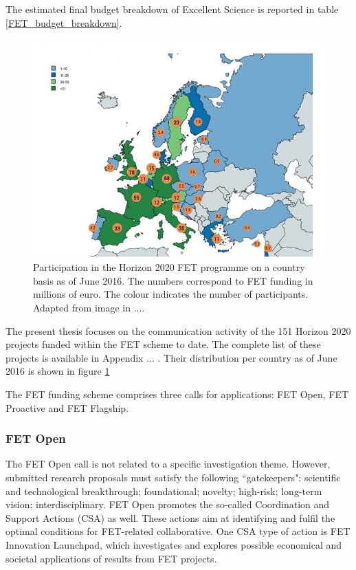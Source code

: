 The estimated final budget breakdown of Excellent Science is reported in table \ref{FET_budget_breakdown}.

\begin{figure}[!t] 
 \begin{center}
 \includegraphics[scale=0.3]{Images/Country_participation_in_H2020_FET_projects.jpg}
 \caption{Participation in the Horizon 2020 FET programme on a country basis as of June 2016. The numbers correspond to FET funding in millions of euro. The colour indicates the number of participants. Adapted from image in ....}
 \label{Country_participation_in_H2020_FET_projects}
 \end{center}
\end{figure}


The present thesis focuses on the communication activity of the 151 Horizon 2020 projects funded within the FET scheme to date. The complete list of these projects is available in Appendix ... . Their distribution per country as of June 2016 is shown in figure \ref{Country_participation_in_H2020_FET_projects}

The FET funding scheme comprises three calls for applications: FET Open, FET Proactive and FET Flagship.

\subsubsection{FET Open}
The FET Open call is not related to a specific investigation theme. However, submitted research proposals must satisfy the following ``gatekeepers": scientific and technological breakthrough; foundational; novelty; high-risk; long-term vision; interdisciplinary. FET Open promotes the so-called Coordination and Support Actions (CSA) as well. These actions aim at identifying and fulfil the optimal conditions for FET-related collaborative. One CSA type of action is FET Innovation Launchpad, which investigates and explores possible economical and societal applications of results from FET projects.

